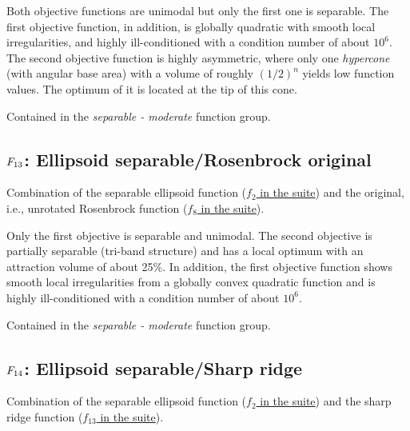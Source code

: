 Both objective functions are unimodal but only the first
one is separable. The first objective function, in addition,
is globally quadratic with smooth local irregularities, and
highly ill-conditioned with a condition number of about
\(10^6\). The second objective function is highly
asymmetric, where only one \emph{hypercone} (with
angular base area) with a volume of roughly \((1/2)^n\)
yields low function values. The optimum of it is located at
the tip of this cone.

Contained in the \emph{separable - moderate} function group.



\subsection[\texorpdfstring{\protect\(F_{13}\protect\): Ellipsoid separable/Rosenbrock original}{F13: Ellipsoid separable/Rosenbrock original}]{\texorpdfstring{\protect\(F_{13}\protect\): Ellipsoid separable/Rosenbrock original}{}}
\label{index:f13}\label{index:ellipsoid-separable-rosenbrock-original}
Combination of the separable ellipsoid function (\href{https://coco.gforge.inria.fr/downloads/download16.00/bbobdocfunctions.pdf\#page=10}{\(f_2\) in the \bbob suite}) and the original, i.e., unrotated Rosenbrock function
(\href{https://coco.gforge.inria.fr/downloads/download16.00/bbobdocfunctions.pdf\#page=40}{\(f_8\) in the \bbob suite}).

Only the first objective is separable and unimodal. The second
objective is partially separable (tri-band structure) and has a local
optimum with an attraction volume of about 25\%.
In addition, the first objective function shows smooth local
irregularities from a globally convex quadratic function and is
highly ill-conditioned with a condition number of about
\(10^6\).

Contained in the \emph{separable - moderate} function group.



\subsection[\texorpdfstring{\protect\(F_{14}\protect\): Ellipsoid separable/Sharp ridge}{F14: Ellipsoid separable/Sharp ridge}]{\texorpdfstring{\protect\(F_{14}\protect\): Ellipsoid separable/Sharp ridge}{}}
\label{index:f14}\label{index:ellipsoid-separable-sharp-ridge}
Combination of the separable ellipsoid function (\href{https://coco.gforge.inria.fr/downloads/download16.00/bbobdocfunctions.pdf\#page=10}{\(f_2\) in the \bbob suite}) and the sharp ridge function (\href{https://coco.gforge.inria.fr/downloads/download16.00/bbobdocfunctions.pdf\#page=65}{\(f_{13}\) in the \bbob suite}).

